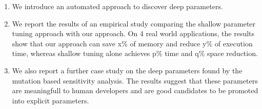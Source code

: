 \begin{enumerate}

\item We introduce an automated approach to discover deep parameters. 

\item We report the results of an empirical study comparing the shallow parameter tuning approach with our approach. On 4 real world applications, the results show that our approach can save x\% of memory and reduce y\% of execution time, whereas shallow tuning alone achieves p\% time and q\% space reduction. 

\item We also report a further case study on the deep parameters found by the mutation based sensitivity analysis. The results suggest that these parameters are meaningfull to human developers and are good candidates to be promoted into explicit parameters. 

\end{enumerate}



